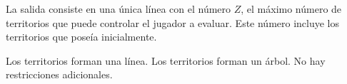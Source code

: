 \documentclass{oci}
\begin{document}
\begin{outputDescription}
  La salida consiste en una única línea con el número $Z$, el máximo número de
  territorios que puede controlar el jugador a evaluar.
  Este número incluye los territorios que poseía inicialmente.
\end{outputDescription}

\begin{scoreDescription}
   Los territorios forman una línea.
   Los territorios forman un árbol.
   No hay restricciones adicionales.
\end{scoreDescription}

\begin{sampleDescription}
\end{sampleDescription}
\end{document}
